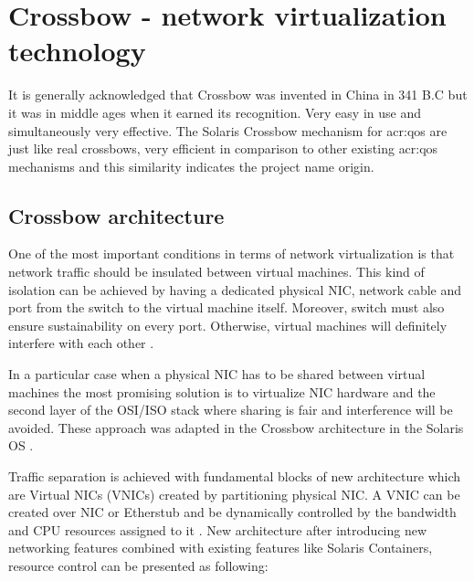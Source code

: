 \documentclass[11pt]{book}
\begin{document}
    \section{Crossbow - network virtualization technology}
    \label{sec:sol:xbow}


      It is generally acknowledged that Crossbow was invented in China in 341 B.C but it was in middle ages when 
      it earned its recognition. Very easy in use and simultaneously very effective. The Solaris Crossbow mechanism 
      for \gls{acr:qos} are just like real crossbows, very efficient in comparison to other existing \gls{acr:qos} mechanisms and this
      similarity indicates the project name origin.


      \subsection{Crossbow architecture}

        One of the most important conditions in terms of network virtualization is that network traffic should be
        insulated between virtual machines. This kind of isolation can be achieved by having a dedicated physical NIC,
        network cable and port from the switch to the virtual machine itself. Moreover, switch must also ensure
        sustainability on every port. Otherwise, virtual machines will definitely interfere with each other \cite{crossbow}.
        
        In a particular case when a physical NIC has to be shared between virtual machines the most promising solution is
        to virtualize NIC hardware and the second layer of the OSI/ISO stack where sharing is fair and interference
        will be avoided. These approach was adapted in the Crossbow architecture in the Solaris OS \cite{crossbow}.
        
        Traffic separation is achieved with fundamental blocks of new architecture which are Virtual NICs (VNICs)
        created by partitioning physical NIC. A VNIC can be created over NIC or Etherstub and
        be dynamically controlled by the bandwidth and CPU resources assigned to it
        \cite{crossbow,network_virtualization}. New architecture after introducing new networking features combined with
        existing features like Solaris Containers, resource control can be presented as following:
\end{document}
